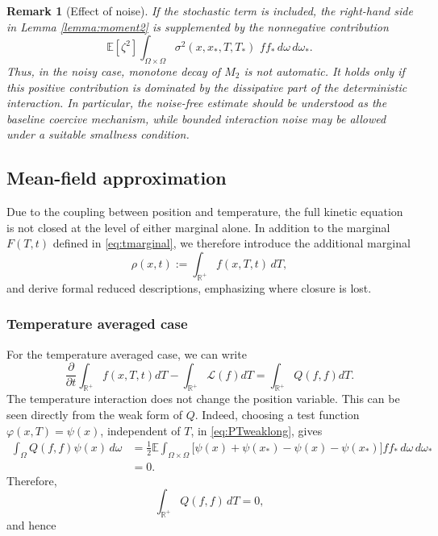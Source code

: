 \documentclass[10pt,a4paper]{article}
\theoremstyle{theorem}
\newtheorem{remark}{Remark}[section]
\numberwithin{equation}{section}
\begin{document}
\begin{remark}[Effect of noise]
\label{rem:lemma2}
If the stochastic term is included, the right-hand side in Lemma \ref{lemma:moment2} is supplemented by the nonnegative contribution
\[
\mathbb{E}[\zeta^2]\int_{\Omega\times\Omega} \sigma^2(x,x_*,T,T_*)\,\,f f_*\,d\omega\,d\omega_*.
\]
Thus, in the noisy case, monotone decay of \(M_2\) is not automatic.
It holds only if this positive contribution is dominated by the
dissipative part of the deterministic interaction. In particular, the noise-free estimate should be understood as the baseline coercive mechanism, while bounded interaction noise may be allowed under a suitable smallness condition.
\end{remark}



\subsection{Mean-field approximation}
\label{sec:meanfield}
Due to the coupling between position and temperature, the full kinetic equation is
not closed at the level of either marginal alone. In addition to the marginal $F(T,t)$ defined 
in \eqref{eq:tmarginal}, we therefore introduce the
additional marginal
\begin{equation}
\rho(x,t):=\int_{\mathbb R^+}f(x,T,t)\,dT,
\end{equation}
and derive formal reduced descriptions, emphasizing where closure is lost. 

\subsubsection{Temperature averaged case}
\label{subsec:meanfield_temp}
For the temperature averaged case, we can write
\begin{equation}
\frac{\partial}{\partial t}\int_{\mathbb{R}^+}f(x,T,t)dT-\int_{\mathbb{R}^+}\mathcal{L}(f)dT=\int_{\mathbb{R}^+}Q(f,f)dT.
\end{equation}
The temperature interaction does not change the position variable. This can be
seen directly from the weak form of \(Q\). Indeed, choosing a test function
\(\varphi(x,T)=\psi(x)\), independent of \(T\), in \eqref{eq:PTweaklong}, gives
\[
\begin{aligned}
\int_\Omega Q(f,f)\psi(x)\,d\omega
&=
\frac12\mathbb E
\int_{\Omega\times\Omega}
\big[
\psi(x)+\psi(x_*)-\psi(x)-\psi(x_*)
\big]
ff_*\,d\omega\,d\omega_* \\
&=0.
\end{aligned}
\]
Therefore, 
\[
\int_{\mathbb R^+}Q(f,f)\,dT=0,
\]
and hence
\end{document}
